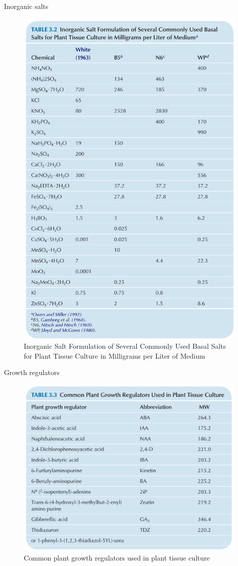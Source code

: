 \documentclass[ignorenonframetext,aspectratio=169]{beamer}
\begin{document}
\begin{frame}{Inorganic salts}
\protect\hypertarget{inorganic-salts-3}{}

\begin{figure}
\includegraphics[width=0.35\linewidth]{../images/is_formulation_mediums} \caption{Inorganic Salt Formulation of Several Commonly Used Basal Salts for Plant Tissue Culture in Milligrams per Liter of Medium}\label{fig:is-formulation}
\end{figure}

\end{frame}

\begin{frame}{Growth regulators}
\protect\hypertarget{growth-regulators}{}

\begin{figure}
\includegraphics[width=0.4\linewidth]{../images/pgr_tissue_culture} \caption{Common plant growth regulators used in plant tissue culture}\label{fig:pgr}
\end{figure}

\end{frame}
\end{document}
